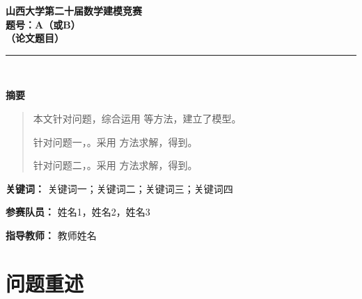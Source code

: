 \documentclass[12pt,a4paper]{article}
\begin{document}
\begin{center}
  {\LARGE\bfseries 山西大学第二十届数学建模竞赛}\\[0.8cm]
  {\huge\bfseries 题号：A（或B）}\\[0.5cm]
  {\LARGE\bfseries （论文题目）}\\[0.3cm]
  \rule{\textwidth}{0.5pt}\\[0.3cm]
\end{center}

\begin{center}
  {\large\bfseries 摘要}
\end{center}

\begin{quotation}
\noindent
本文针对\underline{\hspace{4cm}}问题，综合运用\underline{\hspace{4cm}}
等方法，建立了\underline{\hspace{4cm}}模型。

针对问题一，\underline{\hspace{6cm}}。采用\underline{\hspace{3cm}}
方法求解，得到\underline{\hspace{3cm}}。

针对问题二，\underline{\hspace{6cm}}。采用\underline{\hspace{3cm}}
方法求解，得到\underline{\hspace{3cm}}。

\end{quotation}

\vspace{0.3cm}
\noindent\textbf{关键词：} 关键词一；关键词二；关键词三；关键词四

\vspace{0.5cm}
\noindent\textbf{参赛队员：} 姓名1，姓名2，姓名3

\noindent\textbf{指导教师：} 教师姓名

\newpage

\setcounter{page}{1}

\section{问题重述}
\end{document}
